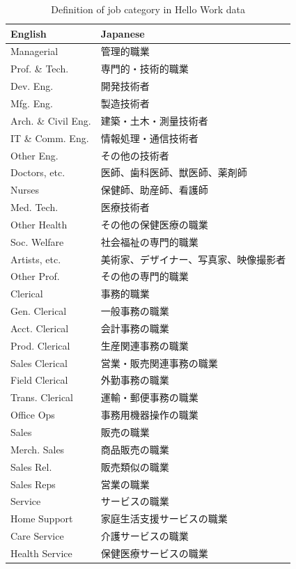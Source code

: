 \documentclass[12pt]{article}
\begin{document}
\begin{table}[!htbp]
  \begin{center}\scriptsize
      \caption{Definition of job category in Hello Work data}
      \label{tb:job_category_list} 
      \begin{tabular}[t]{ll}
\toprule
English & Japanese\\
\midrule
Managerial & 管理的職業\\
Prof. \& Tech. & 専門的・技術的職業\\
Dev. Eng. & 開発技術者\\
Mfg. Eng. & 製造技術者\\
Arch. \& Civil Eng. & 建築・土木・測量技術者\\
IT \& Comm. Eng. & 情報処理・通信技術者\\
Other Eng. & その他の技術者\\
Doctors, etc. & 医師、歯科医師、獣医師、薬剤師\\
Nurses & 保健師、助産師、看護師\\
Med. Tech. & 医療技術者\\
Other Health & その他の保健医療の職業\\
Soc. Welfare & 社会福祉の専門的職業\\
Artists, etc. & 美術家、デザイナー、写真家、映像撮影者\\
Other Prof. & その他の専門的職業\\
Clerical & 事務的職業\\
Gen. Clerical & 一般事務の職業\\
Acct. Clerical & 会計事務の職業\\
Prod. Clerical & 生産関連事務の職業\\
Sales Clerical & 営業・販売関連事務の職業\\
Field Clerical & 外勤事務の職業\\
Trans. Clerical & 運輸・郵便事務の職業\\
Office Ops & 事務用機器操作の職業\\
Sales & 販売の職業\\
Merch. Sales & 商品販売の職業\\
Sales Rel. & 販売類似の職業\\
Sales Reps & 営業の職業\\
Service & サービスの職業\\
Home Support & 家庭生活支援サービスの職業\\
Care Service & 介護サービスの職業\\
Health Service & 保健医療サービスの職業\\

\end{tabular}
\end{center}
\end{table}
\end{document}
